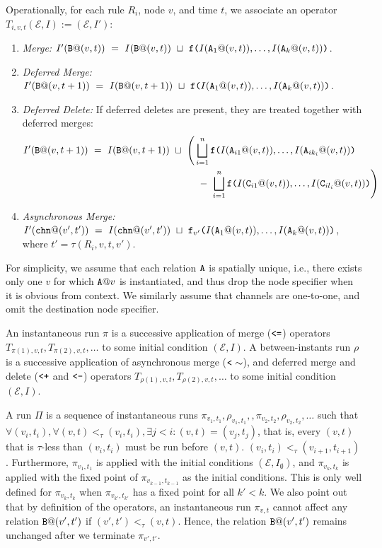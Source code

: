 \documentclass{article}
\numberwithin{equation}{section}
\renewcommand{\tt}[1]{\ifmmode\text{\texttt{#1}}\else\texttt{#1}\fi}
\begin{document}
Operationally, for each rule $R_i$, node $v$, and time $t$, we associate an operator $T_{i,v,t}(\mathcal{E}, I) := (\mathcal{E}, I')$:
\begin{enumerate}
\item\emph{Merge:} $I'(\tt{B}@(v,t)) ~=~ I(\tt{B}@(v,t)) ~\sqcup~ \tt{f(}I(\tt{A}_1@(v,t)),\dots,I(\tt{A}_k@(v,t))\tt{)}$.
\item\emph{Deferred Merge:} $I'(\tt{B}@(v,t+1)) ~=~ I(\tt{B}@(v,t+1)) ~\sqcup~ \tt{f(}I(\tt{A}_1@(v,t)),\dots,I(\tt{A}_k@(v,t))\tt{)}$.
\item\emph{Deferred Delete:} If deferred deletes are present, they are treated together with deferred merges:
\begin{align*}
I'(\tt{B}@(v,t+1)) ~=~ I(\tt{B}@(v,t+1)) ~\sqcup~ \Bigg(
&\bigsqcup_{i=1}^n \tt{f(}I(\tt{A}_{i1}@(v,t)),\dots,I(\tt{A}_{ik_i}@(v,t))\tt{)}\\
&~-~
\bigsqcup_{i=1}^n \tt{f(}I(\tt{C}_{i1}@(v,t)),\dots,I(\tt{C}_{il_i}@(v,t))\tt{)}
\Bigg)
\end{align*}
\item\emph{Asynchronous Merge:} $I'(\tt{chn}@(v',t')) ~=~ I(\tt{chn}@(v',t')) ~\sqcup~ \tt{f}_{v'}\tt{(}I(\tt{A}_1@(v,t)),\dots,I(\tt{A}_k@(v,t))\tt{)}$, where $t' = \tau(R_i, v, t, v')$.
\end{enumerate}
For simplicity, we assume that each relation $\tt{A}$ is spatially unique, i.e., there exists only one $v$ for which $\tt{A}@v$ is instantiated, and thus drop the node specifier when it is obvious from context.
We similarly assume that channels are one-to-one, and omit the destination node specifier.

An instantaneous run $\pi$ is a successive application of merge ($\tt{<=}$) operators $T_{\pi(1),v,t}, T_{\pi(2),v,t}, \dots$ to some initial condition $(\mathcal{E}, I)$.
A between-instants run $\rho$ is a successive application of asynchronous merge ($\tt{<}\sim$), and deferred merge and delete ($\tt{<+}$ and $\tt{<-}$) operators $T_{\rho(1),v,t}, T_{\rho(2),v,t}, \dots$ to some initial condition $(\mathcal{E}, I)$.

A run $\Pi$ is a sequence of instantaneous runs $\pi_{v_1,t_1}, \rho_{v_1,t_1},, \pi_{v_2,t_2}, \rho_{v_2,t_2}, \dots$ such that $\forall (v_i, t_i), \forall (v, t) <_\tau (v_i, t_i), \exists j < i: (v, t) = (v_j, t_j)$, that is, every $(v,t)$ that is $\tau$-less than $(v_i, t_i)$ must be run before $(v,t)$.
$(v_i, t_i) <_\tau (v_{i+1}, t_{i+1})$.
Furthermore, $\pi_{v_1, t_1}$ is applied with the initial conditions $(\mathcal{E}, I_\emptyset)$, and $\pi_{v_k,t_k}$ is applied with the fixed point of $\pi_{v_{k-1}, t_{k-1}}$ as the initial conditions.
This is only well defined for $\pi_{v_k, t_k}$ when $\pi_{v_{k'}, t_{k'}}$ has a fixed point for all $k' < k$.
We also point out that by definition of the operators, an instantaneous run $\pi_{v,t}$ cannot affect any relation $\tt{B}@(v',t')$ if $(v',t') <_\tau (v,t)$.
Hence, the relation $\tt{B}@(v',t')$ remains unchanged after we terminate $\pi_{v',t'}$.
\end{document}
